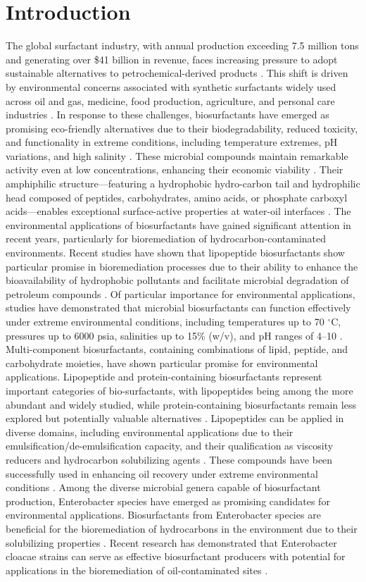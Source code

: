 \documentclass{svjour3}
\begin{document}
\section{Introduction}
The global surfactant industry, with annual production exceeding 7.5 million tons and generating over \$41 billion in revenue, faces increasing pressure to adopt sustainable alternatives to petrochemical-derived products \cite{ref1}. This shift is driven by environmental concerns associated with synthetic surfactants widely used across oil and gas, medicine, food production, agriculture, and personal care industries \cite{ref2}.
In response to these challenges, biosurfactants have emerged as promising eco-friendly alternatives due to their biodegradability, reduced toxicity, and functionality in extreme conditions, including temperature extremes, pH variations, and high salinity \cite{ref3}. These microbial compounds maintain remarkable activity even at low concentrations, enhancing their economic viability \cite{ref4}. Their amphiphilic structure—featuring a hydrophobic hydro-carbon tail and hydrophilic head composed of peptides, carbohydrates, amino acids, or phosphate carboxyl acids—enables exceptional surface-active properties at water-oil interfaces \cite{ref5}.
The environmental applications of biosurfactants have gained significant attention in recent years, particularly for bioremediation of hydrocarbon-contaminated environments. Recent studies have shown that lipopeptide biosurfactants show particular promise in bioremediation processes due to their ability to enhance the bioavailability of hydrophobic pollutants and facilitate microbial degradation of petroleum compounds \cite{ref6, ref7}. Of particular importance for environmental applications, studies have demonstrated that microbial biosurfactants can function effectively under extreme environmental conditions, including temperatures up to 70 $^\circ$C, pressures up to 6000 psia, salinities up to 15\% (w/v), and pH ranges of 4–10 \cite{ref8, ref9}.
Multi-component biosurfactants, containing combinations of lipid, peptide, and carbohydrate moieties, have shown particular promise for environmental applications.
Lipopeptide and protein-containing biosurfactants represent important categories of bio-surfactants, with lipopeptides being among the more abundant and widely studied, while protein-containing biosurfactants remain less explored but potentially valuable alternatives \cite{ref10}. Lipopeptides can be applied in diverse domains, including environmental applications due to their emulsification/de-emulsification capacity, and their qualification as viscosity reducers and hydrocarbon solubilizing agents \cite{ref11}. These compounds have been successfully used in enhancing oil recovery under extreme environmental conditions \cite{ref12}. Among the diverse microbial genera capable of biosurfactant production, Enterobacter species have emerged as promising candidates for environmental applications. Biosurfactants from Enterobacter species are beneficial for the bioremediation of hydrocarbons in the environment due to their solubilizing properties \cite{ref13}. Recent research has demonstrated that Enterobacter cloacae strains can serve as effective biosurfactant producers with potential for applications in the bioremediation of oil-contaminated sites \cite{ref14}.
\end{document}

